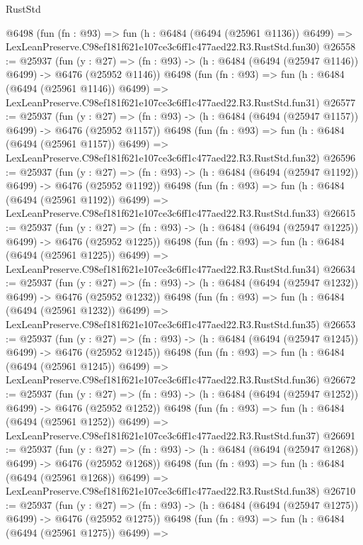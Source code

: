 \begin{lexlean}{RustStd}
\begin{coremodule}
    @6498
    (fun (fn : @93) =>
    fun (h : @6484 (@6494 (@25961 @1136)) @6499) =>
    LexLeanPreserve.C98ef181f621e107ce3c6ff1c477aed22.R3.RustStd.fun30)
@26558 := @25937
    (fun (y : @27) =>
    (fn : @93) -> (h : @6484 (@6494 (@25947 @1146)) @6499) -> @6476 (@25952 @1146))
    @6498
    (fun (fn : @93) =>
    fun (h : @6484 (@6494 (@25961 @1146)) @6499) =>
    LexLeanPreserve.C98ef181f621e107ce3c6ff1c477aed22.R3.RustStd.fun31)
@26577 := @25937
    (fun (y : @27) =>
    (fn : @93) -> (h : @6484 (@6494 (@25947 @1157)) @6499) -> @6476 (@25952 @1157))
    @6498
    (fun (fn : @93) =>
    fun (h : @6484 (@6494 (@25961 @1157)) @6499) =>
    LexLeanPreserve.C98ef181f621e107ce3c6ff1c477aed22.R3.RustStd.fun32)
@26596 := @25937
    (fun (y : @27) =>
    (fn : @93) -> (h : @6484 (@6494 (@25947 @1192)) @6499) -> @6476 (@25952 @1192))
    @6498
    (fun (fn : @93) =>
    fun (h : @6484 (@6494 (@25961 @1192)) @6499) =>
    LexLeanPreserve.C98ef181f621e107ce3c6ff1c477aed22.R3.RustStd.fun33)
@26615 := @25937
    (fun (y : @27) =>
    (fn : @93) -> (h : @6484 (@6494 (@25947 @1225)) @6499) -> @6476 (@25952 @1225))
    @6498
    (fun (fn : @93) =>
    fun (h : @6484 (@6494 (@25961 @1225)) @6499) =>
    LexLeanPreserve.C98ef181f621e107ce3c6ff1c477aed22.R3.RustStd.fun34)
@26634 := @25937
    (fun (y : @27) =>
    (fn : @93) -> (h : @6484 (@6494 (@25947 @1232)) @6499) -> @6476 (@25952 @1232))
    @6498
    (fun (fn : @93) =>
    fun (h : @6484 (@6494 (@25961 @1232)) @6499) =>
    LexLeanPreserve.C98ef181f621e107ce3c6ff1c477aed22.R3.RustStd.fun35)
@26653 := @25937
    (fun (y : @27) =>
    (fn : @93) -> (h : @6484 (@6494 (@25947 @1245)) @6499) -> @6476 (@25952 @1245))
    @6498
    (fun (fn : @93) =>
    fun (h : @6484 (@6494 (@25961 @1245)) @6499) =>
    LexLeanPreserve.C98ef181f621e107ce3c6ff1c477aed22.R3.RustStd.fun36)
@26672 := @25937
    (fun (y : @27) =>
    (fn : @93) -> (h : @6484 (@6494 (@25947 @1252)) @6499) -> @6476 (@25952 @1252))
    @6498
    (fun (fn : @93) =>
    fun (h : @6484 (@6494 (@25961 @1252)) @6499) =>
    LexLeanPreserve.C98ef181f621e107ce3c6ff1c477aed22.R3.RustStd.fun37)
@26691 := @25937
    (fun (y : @27) =>
    (fn : @93) -> (h : @6484 (@6494 (@25947 @1268)) @6499) -> @6476 (@25952 @1268))
    @6498
    (fun (fn : @93) =>
    fun (h : @6484 (@6494 (@25961 @1268)) @6499) =>
    LexLeanPreserve.C98ef181f621e107ce3c6ff1c477aed22.R3.RustStd.fun38)
@26710 := @25937
    (fun (y : @27) =>
    (fn : @93) -> (h : @6484 (@6494 (@25947 @1275)) @6499) -> @6476 (@25952 @1275))
    @6498
    (fun (fn : @93) =>
    fun (h : @6484 (@6494 (@25961 @1275)) @6499) =>

\end{coremodule}
\end{lexlean}
